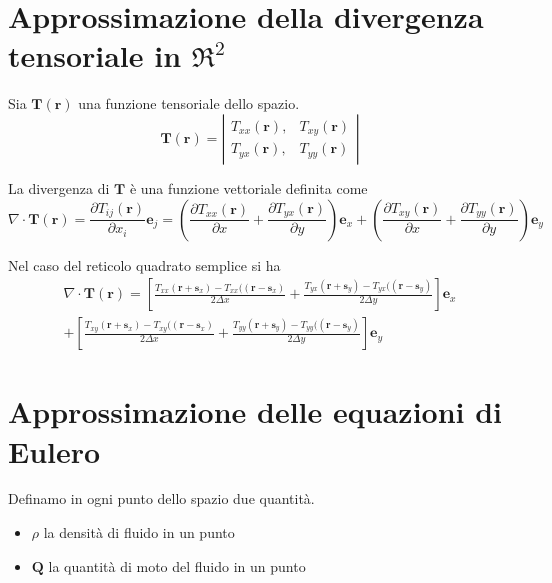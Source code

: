 \documentclass[a4paper,11pt]{article}
\begin{document}
\section{Approssimazione della divergenza tensoriale in $ \Re^2 $}

Sia $ \mathbf{T}(\mathbf{r}) $ una funzione tensoriale dello spazio.
\[
	\mathbf{T}(\mathbf{r}) = 
	\left|
	\begin{array}{ll}
	T_{xx}(\mathbf{r}), & T_{xy}(\mathbf{r})
	\\
	T_{yx}(\mathbf{r}), & T_{yy}(\mathbf{r})
	\end{array}
	\right|
\]

La divergenza di $ \mathbf{T} $ è una funzione vettoriale definita come 
\[
  \nabla \cdot \mathbf{T}(\mathbf{r})
    = \frac{ \partial T_{ij}(\mathbf{r})}{\partial x_i} \mathbf{e}_j
  	= \left( \frac{ \partial T_{xx}(\mathbf{r})}{\partial x} 
  	+ \frac{ \partial T_{yx}(\mathbf{r})}{\partial y} 
  	\right) \mathbf{e}_x
  	+ \left( \frac{ \partial T_{xy}(\mathbf{r})}{\partial x} 
  	+ \frac{ \partial T_{yy}(\mathbf{r})}{\partial y} 
  	\right) \mathbf{e}_y
\]

Nel caso del reticolo quadrato semplice si ha
\[
\begin{array}{r}
  \nabla \cdot \mathbf{T}(\mathbf{r})
    = 
    	\left[
    \frac{T_{xx}(\mathbf{r}+\mathbf{s}_x)-T_{xx}((\mathbf{r}-\mathbf{s}_x)}{2 \Delta x}
+    \frac{T_{yx}(\mathbf{r}+\mathbf{s}_y)-T_{yx}((\mathbf{r}-\mathbf{s}_y)}{2 \Delta y}
    \right] \mathbf{e}_x
    \\
    +
    	\left[
    \frac{T_{xy}(\mathbf{r}+\mathbf{s}_x)-T_{xy}((\mathbf{r}-\mathbf{s}_x)}{2 \Delta x}
+    \frac{T_{yy}(\mathbf{r}+\mathbf{s}_y)-T_{yy}((\mathbf{r}-\mathbf{s}_y)}{2 \Delta y}
    \right] \mathbf{e}_y
\end{array}
\]


\section{Approssimazione delle equazioni di Eulero}

Definamo in ogni punto dello spazio due quantità.
\begin{itemize}
  \item
   $ \rho $ la densità di fluido in un punto
   \item
   $ \mathbf{Q} $ la quantità di moto del fluido in un punto
\end{itemize}
\end{document}
